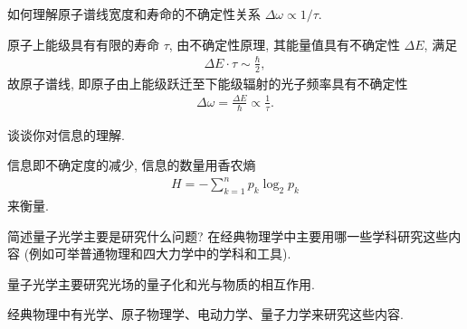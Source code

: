 \documentclass{assignment}
\begin{document}
\begin{prob}[附加题]
    如何理解原子谱线宽度和寿命的不确定性关系 $\Delta\omega\propto 1/\tau$.
\end{prob}
\begin{sol}
    原子上能级具有有限的寿命 $\tau$, 由不确定性原理, 其能量值具有不确定性 $\Delta E$, 满足
    \begin{align}
        \Delta E\cdot\tau\sim\frac{\hbar}{2},
    \end{align}
    故原子谱线, 即原子由上能级跃迁至下能级辐射的光子频率具有不确定性
    \begin{align}
        \Delta\omega=\frac{\Delta E}{\hbar}\propto\frac{1}{\tau}.
    \end{align}
\end{sol}

\begin{prob}[附加题]
    谈谈你对信息的理解.
\end{prob}
\begin{sol}
    信息即不确定度的减少, 信息的数量用香农熵
    \begin{align}
        H=-\sum_{k=1}^np_k\log_2p_k
    \end{align}
    来衡量.
\end{sol}

\begin{prob}[附加题]
    简述量子光学主要是研究什么问题? 在经典物理学中主要用哪一些学科研究这些内容 (例如可举普通物理和四大力学中的学科和工具).
\end{prob}
\begin{sol}
    量子光学主要研究光场的量子化和光与物质的相互作用.

    经典物理中有光学、原子物理学、电动力学、量子力学来研究这些内容.
\end{sol}
\end{document}
